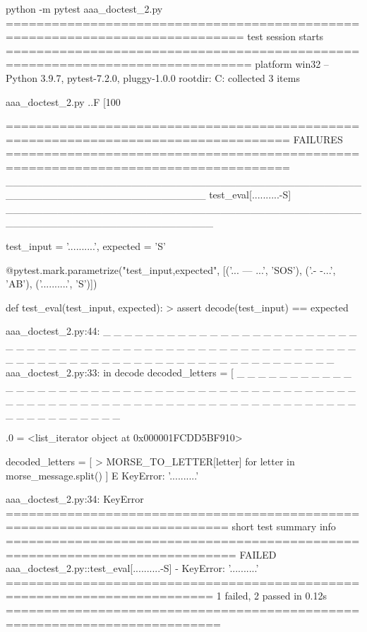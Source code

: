 python -m pytest aaa_doctest_2.py
============================================================================= test session starts ==============================================================================
platform win32 -- Python 3.9.7, pytest-7.2.0, pluggy-1.0.0
rootdir: C:\Users{}
collected 3 items                                                                                                                                                                

aaa_doctest_2.py ..F                                                                                                                                                      [100%

=================================================================================== FAILURES =================================================================================== 
___________________________________________________________________________ test_eval[..........-S] ____________________________________________________________________________ 

test_input = '..........', expected = 'S'

    @pytest.mark.parametrize("test_input,expected", [('... --- ...', 'SOS'), ('.- -...', 'AB'), ('..........', 'S')])


    def test_eval(test_input, expected):
>       assert decode(test_input) == expected

aaa_doctest_2.py:44:
_ _ _ _ _ _ _ _ _ _ _ _ _ _ _ _ _ _ _ _ _ _ _ _ _ _ _ _ _ _ _ _ _ _ _ _ _ _ _ _ _ _ _ _ _ _ _ _ _ _ _ _ _ _ _ _ _ _ _ _ _ _ _ _ _ _ _ _ _ _ _ _ _ _ _ _ _ _ _ _ _ _ _ _ _ _ _ _  
aaa_doctest_2.py:33: in decode
    decoded_letters = [
_ _ _ _ _ _ _ _ _ _ _ _ _ _ _ _ _ _ _ _ _ _ _ _ _ _ _ _ _ _ _ _ _ _ _ _ _ _ _ _ _ _ _ _ _ _ _ _ _ _ _ _ _ _ _ _ _ _ _ _ _ _ _ _ _ _ _ _ _ _ _ _ _ _ _ _ _ _ _ _ _ _ _ _ _ _ _ _  

.0 = <list_iterator object at 0x000001FCDD5BF910>

    decoded_letters = [
>       MORSE_TO_LETTER[letter] for letter in morse_message.split()
    ]
E   KeyError: '..........'

aaa_doctest_2.py:34: KeyError
=========================================================================== short test summary info ============================================================================ 
FAILED aaa_doctest_2.py::test_eval[..........-S] - KeyError: '..........'
========================================================================= 1 failed, 2 passed in 0.12s ==========================================================================